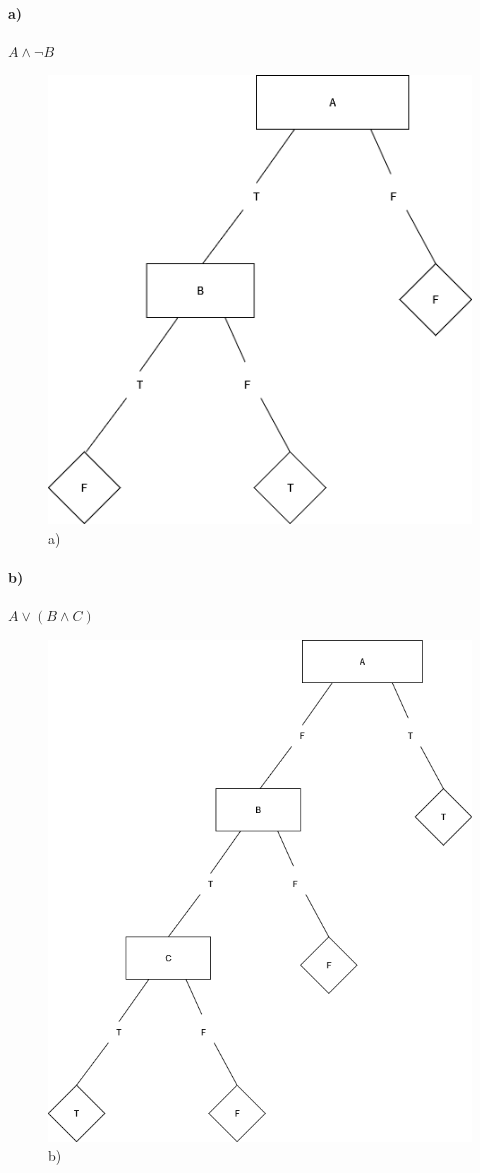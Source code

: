 \documentclass[12pt]{article}
\begin{document}
	\paragraph{a)} $A \land \neg B$
		\begin{figure}[H]
			\centering
			\includegraphics[width=120mm]{Untitled Diagram3.png} 
			\caption{a)}
		\end{figure}
	
	\newpage
	
	\paragraph{b)} $A \lor (B \land C)$
	\begin{figure}[H]
		\centering
		\includegraphics[width=120mm]{Untitled Diagram4.png} 
		\caption{b)}
	\end{figure}
\end{document}
